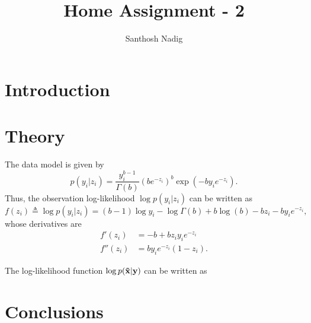 \documentclass[a4paper,10pt]{article}
\title{Home Assignment - 2}
\author{Santhosh Nadig}
\def\by{{\bf y}}
\def\btx{{\bf{\tilde x}}}
\begin{document}
\maketitle

\section{Introduction}

\section{Theory}
The data model is given by
\begin{equation*}
 p(y_i|z_i) = \frac{y_i^{b-1}}{\Gamma(b)} (be^{-z_i})^b \exp (-by_ie^{-z_i}).
\end{equation*}
Thus, the observation log-likelihood $\log p(y_i|z_i)$ can be written as
\begin{equation*}
 f(z_i) \triangleq \log p(y_i|z_i) = (b-1) \log y_i - \log \Gamma(b) + b \log (b) - b z_i - b y_i e^{-z_i},
\end{equation*}
whose derivatives are
\begin{align*}
 f'(z_i) &= -b + b z_i y_i e^{-z_i} \\
 f''(z_i) &= b y_i e^{-z_i} (1 - z_i) .
\end{align*}

The log-likelihood function $\log p(\btx|\by)$ can be written as

\section{Conclusions}
\end{document}
